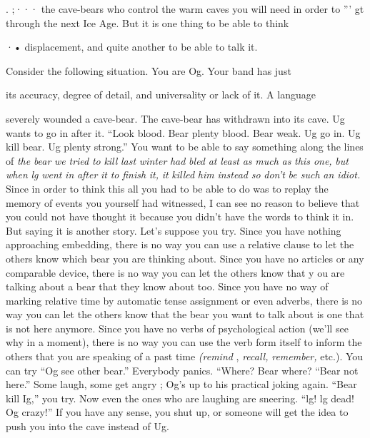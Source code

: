 . ;··· the cave-bears who control the warm caves you will need in order to ''' gt through the next Ice Age. But it is one thing to be able to think

·• displacement, and quite another to be able to talk it.

 

Consider the following situation. You are Og. Your band has just


its accuracy, degree of detail, and universality or lack of it. A language

severely wounded a cave-bear. The cave-bear has withdrawn into its cave. Ug wants to go in after it. ``Look blood. Bear plenty blood. Bear weak. Ug go in. Ug kill bear. Ug plenty strong.'' You want to be able to say something along the lines of \textit{the} \textit{bear} \textit{we} \textit{tried} \textit{to} \textit{kill} \textit{last} \textit{winter} \textit{had} \textit{bled} \textit{at} \textit{least} \textit{as} \textit{much} \textit{as} \textit{this one,} \textit{but} \textit{when} \textit{l}\textit{g} \textit{went} \textit{in} \textit{after} \textit{it} \textit{to} \textit{finish} \textit{it,} \textit{it} \textit{killed} \textit{him} \textit{instead} \textit{so} \textit{don't} \textit{be such} \textit{an idiot.} Since in order to think this all you had to be able to do was to replay the memory of events you yourself had witnessed, I can see no reason to believe that you could not have thought it because you didn't have the words to think it in. But saying it is another story. Let's suppose you try. Since you have nothing approaching embedding, there is no way you can use a relative clause to let the others know which bear you are thinking about. Since you have no articles or any comparable device, there is no way you can let the others know that y ou are talking about a bear that they know about too. Since you have no way of marking relative time by automatic tense assignment or even adverbs, there is no way you can let the others know that the bear you want to talk about is one that is not here anymore. Since you have no verbs of psychological action (we'll see why in a moment), there is no way you can use the verb form itself to inform the others that you are speaking of a past time \textit{(remind} , \textit{recall,} \textit{remember,} etc.). You can try ``Og see other bear.'' Everybody panics. ``Where? Bear where?{\textquotedbl} ``Bear not here.'' Some laugh, some get angry ; Og's up to his practical joking again. ``Bear kill Ig,'' you try. Now even the ones who are laughing are sneering. ``lg! lg dead! Og crazy!'' If you have any sense, you
shut up, or someone will get the idea to push you into the cave instead
of Ug.

